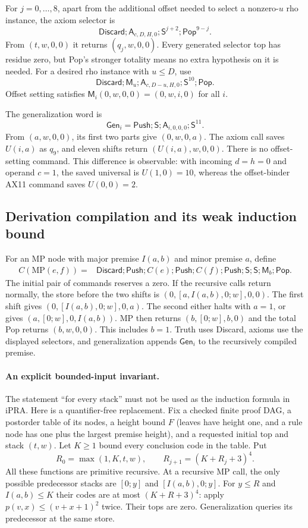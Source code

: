 For $j=0,\ldots,8$, apart from the additional offset needed to select a
nonzero-$u$ rho instance, the axiom selector is
\[
 \mathsf{Discard};\mathsf A_{c,D,H,0};\mathsf S^{j+2};
                         \mathsf{Pop}^{9-j}.
\]
From $(t,w,0,0)$ it returns $(q_j,w,0,0)$. Every generated selector top
has residue zero, but Pop's stronger totality means no extra hypothesis on
it is needed. For a desired rho instance with $u\le D$, use
\[
 \mathsf{Discard};\mathsf M_u;\mathsf A_{c,D-u,H,0};
                      \mathsf S^{10};\mathsf{Pop}.
\]
Offset setting satisfies $\mathsf M_i(0,w,0,0)=(0,w,i,0)$ for all $i$.

The generalization word is
\[
 \boxed{\mathsf{Gen}_i=
      \mathsf{Push};\mathsf S;\mathsf A_{i,0,0,0};\mathsf S^{11}.}
\]
From $(a,w,0,0)$, its first two parts give $(0,w,0,a)$. The axiom call
saves $U(i,a)$ as $q_9$, and eleven shifts return $(U(i,a),w,0,0)$.
There is no offset-setting command. This difference is observable:
with incoming $d=h=0$ and operand $c=1$, the saved universal is
$U(1,0)=10$, whereas the offset-binder AX11 command saves $U(0,0)=2$.

\subsection{Derivation compilation and its weak induction bound}

For an MP node with major premise $I(a,b)$ and minor premise $a$, define
\[
\begin{split}
 C(\mathrm{MP}(e,f))={}&\mathsf{Discard};\mathsf{Push};
 C(e);\mathsf{Push};C(f);\mathsf{Push};\mathsf S;\mathsf S;
 \mathsf M_b;\mathsf{Pop}.
\end{split}
\]
The initial pair of commands reserves a zero. If the recursive calls
return normally, the store before the two shifts is
$(0,[a,I(a,b),0;w],0,0)$. The first shift gives
$(0,[I(a,b),0;w],0,a)$. The second either halts with $a=1$, or gives
$(a,[0;w],0,I(a,b))$. MP then returns $(b,[0;w],b,0)$ and the total
Pop returns $(b,w,0,0)$. This includes $b=1$. Truth uses Discard,
axioms use the displayed selectors, and generalization appends
$\mathsf{Gen}_i$ to the recursively compiled premise.

\paragraph{An explicit bounded-input invariant.}
The statement ``for every stack'' must not be used as the induction
formula in iPRA. Here is a quantifier-free replacement. Fix a checked
finite proof DAG, a postorder table of its nodes, a height bound $F$ (leaves have height one, and a rule node has one
plus the largest premise height), and a requested initial top and stack $(t,w)$. Let $K\ge1$ bound every
conclusion code in the table. Put
\[
 R_0=\max(1,K,t,w),\qquad R_{j+1}=(K+R_j+3)^4.
\]
All these functions are primitive recursive. At a recursive MP call,
the only possible predecessor stacks are $[0;y]$ and $[I(a,b),0;y]$.
For $y\le R$ and $I(a,b)\le K$ their codes are at most
$(K+R+3)^4$: apply $p(v,x)\le(v+x+1)^2$ twice. Their tops are zero.
Generalization queries its predecessor at the same store.

